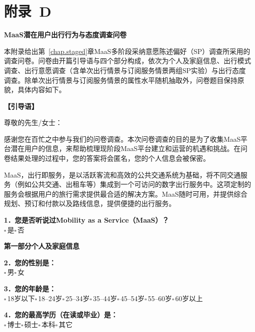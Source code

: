 
\setlength{\baselineskip}{16pt}
\chapter{附录~D}\label{appen.d}

\begin{center}
\textbf{MaaS潜在用户出行行为与态度调查问卷}
\end{center}

\providecommand{\qbox}{$\square$\,}

本附录给出第~\ref{chap.staged}章MaaS多阶段采纳意愿陈述偏好（SP）调查所采用的调查问卷。问卷由开篇引导语与四个部分构成，依次为个人及家庭信息、出行模式调查、出行意愿调查（含单次出行情景与订阅服务情景两组SP实验）与出行态度调查。除单次出行情景与订阅服务情景的属性水平随机抽取外，问卷题目保持原貌，具体内容如下。

\vspace{0.6em}
\noindent\textbf{【引导语】}

尊敬的先生/女士：

感谢您在百忙之中参与我们的问卷调查。本次问卷调查的目的是为了收集MaaS平台潜在用户的信息，来帮助梳理现阶段MaaS平台建立和运营的机遇和挑战。在问卷结果处理的过程中，您的答案将会匿名，您的个人信息会被保密。

MaaS，出行即服务，是以活跃客流和高效的公共交通系统为基础，将不同交通服务（例如公共交通、出租车等）集成到一个可访问的数字出行服务中。这项定制的服务会根据用户的旅行需求提供最合适的解决方案。MaaS随时可用，并提供综合规划、预订和付款以及路线信息，提供便捷的出行服务。

\noindent\textbf{1．您是否听说过Mobility as a Service（MaaS）？}\\
\qbox 是\quad \qbox 否

\vspace{0.6em}
\noindent\textbf{第一部分\quad 个人及家庭信息}

\noindent\textbf{2．您的性别是：}\\
\qbox 男\quad \qbox 女

\noindent\textbf{3．您的年龄是：}\\
\qbox 18岁以下\quad \qbox 18--24岁\quad \qbox 25--34岁\quad \qbox 35--44岁\quad \qbox 45--54岁\quad \qbox 55--60岁\quad \qbox 60岁以上

\noindent\textbf{4．您的最高学历（在读或毕业）是：}\\
\qbox 博士\quad \qbox 硕士\quad \qbox 本科\quad \qbox 其它

